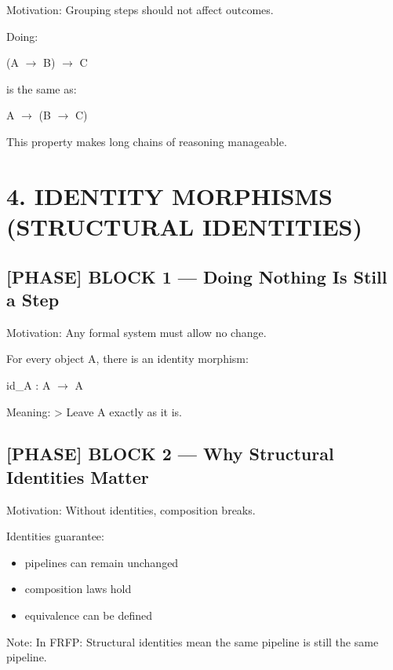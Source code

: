 Motivation: Grouping steps should not affect outcomes.\par

Doing:\par

(A $\to$ B) $\to$ C\par

is the same as:\par

A $\to$ (B $\to$ C)\par

 This property makes long chains of reasoning manageable.\par

\section*{4. IDENTITY MORPHISMS (STRUCTURAL IDENTITIES)}

\subsection*{[PHASE] BLOCK 1 --- Doing Nothing Is Still a Step}

Motivation: Any formal system must allow no change.\par

For every object A, there is an identity morphism:\par

id\_A : A $\to$ A\par

Meaning: > Leave A exactly as it is. \par

\subsection*{[PHASE] BLOCK 2 --- Why Structural Identities Matter}

Motivation: Without identities, composition breaks.\par

Identities guarantee:\n\n\begin{itemize}\n\item pipelines can remain unchanged
\item composition laws hold
\item equivalence can be defined\n\end{itemize}

Note: In FRFP: Structural identities mean the same pipeline is still the same pipeline.\par

